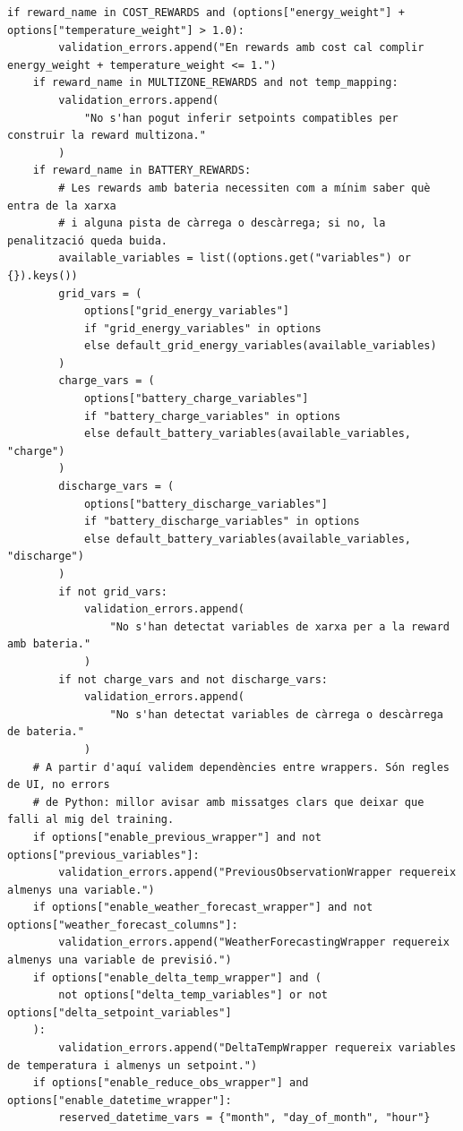 \documentclass[10pt,a4paper]{article}
\begin{document}
\begin{lstlisting}[style=studioPython,caption={backend/entrenar\_agent\_rewards.py},label={lst:backend-entrenar-agent-rewards-py}]
    if reward_name in COST_REWARDS and (options["energy_weight"] + options["temperature_weight"] > 1.0):
        validation_errors.append("En rewards amb cost cal complir energy_weight + temperature_weight <= 1.")
    if reward_name in MULTIZONE_REWARDS and not temp_mapping:
        validation_errors.append(
            "No s'han pogut inferir setpoints compatibles per construir la reward multizona."
        )
    if reward_name in BATTERY_REWARDS:
        # Les rewards amb bateria necessiten com a mínim saber què entra de la xarxa
        # i alguna pista de càrrega o descàrrega; si no, la penalització queda buida.
        available_variables = list((options.get("variables") or {}).keys())
        grid_vars = (
            options["grid_energy_variables"]
            if "grid_energy_variables" in options
            else default_grid_energy_variables(available_variables)
        )
        charge_vars = (
            options["battery_charge_variables"]
            if "battery_charge_variables" in options
            else default_battery_variables(available_variables, "charge")
        )
        discharge_vars = (
            options["battery_discharge_variables"]
            if "battery_discharge_variables" in options
            else default_battery_variables(available_variables, "discharge")
        )
        if not grid_vars:
            validation_errors.append(
                "No s'han detectat variables de xarxa per a la reward amb bateria."
            )
        if not charge_vars and not discharge_vars:
            validation_errors.append(
                "No s'han detectat variables de càrrega o descàrrega de bateria."
            )
    # A partir d'aquí validem dependències entre wrappers. Són regles de UI, no errors
    # de Python: millor avisar amb missatges clars que deixar que falli al mig del training.
    if options["enable_previous_wrapper"] and not options["previous_variables"]:
        validation_errors.append("PreviousObservationWrapper requereix almenys una variable.")
    if options["enable_weather_forecast_wrapper"] and not options["weather_forecast_columns"]:
        validation_errors.append("WeatherForecastingWrapper requereix almenys una variable de previsió.")
    if options["enable_delta_temp_wrapper"] and (
        not options["delta_temp_variables"] or not options["delta_setpoint_variables"]
    ):
        validation_errors.append("DeltaTempWrapper requereix variables de temperatura i almenys un setpoint.")
    if options["enable_reduce_obs_wrapper"] and options["enable_datetime_wrapper"]:
        reserved_datetime_vars = {"month", "day_of_month", "hour"}

\end{lstlisting}
\end{document}
